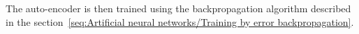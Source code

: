 \documentclass[a4paper,11pt]{report}
\newcommand{\Important}[1]{\textbf{{\em #1}}}
\begin{document}
		The auto-encoder is then trained using the backpropagation algorithm described in the section~\ref{seq:Artificial neural networks/Training by error backpropagation}.					
		
		
% 		
% 		
% 			
% 			
% 			
% 		
% 
\end{document}
